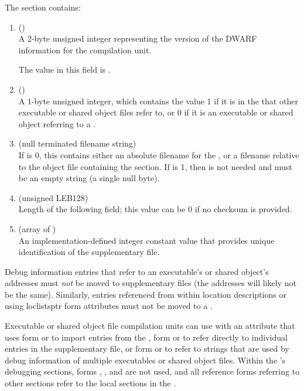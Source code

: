 The \dotdebugsup{} section contains:
\begin{enumerate}[1. ]
\item \HFNversion{} (\HFTuhalf) \\
A 2-byte unsigned integer representing the version of the DWARF
information for the compilation unit. 

The value in this field is \versiondotdebugsup.

\item \HFNissupplementary{} (\HFTubyte) \\
A 1-byte unsigned integer, which contains the value 1 if it is
in the  that other executable or 
shared object files refer to, or 0 if it is an executable or shared object 
referring to a .

\item \HFNsupfilename{} (null terminated filename string) \\
If \HFNissupplementary{} is 0, this contains either an absolute 
filename for the , or a filename 
relative to the object file containing the \dotdebugsup{} section.  
If \HFNissupplementary{} is 1, then \HFNsupfilename{}
is not needed and must be an empty string (a single null byte).

\item \HFNsupchecksumlen{} (unsigned LEB128) \\
Length of the following \HFNsupchecksum{} field; 
this value can be 0 if no checksum is provided.

\item \HFNsupchecksum{} (array of \HFTubyte) \\
An implementation-defined integer constant value that
provides unique identification of the supplementary file.

\end{enumerate}

Debug information entries that refer to an executable's or shared
object's addresses must \emph{not} be moved to supplementary files 
(the addresses will likely not be the same). Similarly,
entries referenced from within location descriptions or using loclistsptr
form attributes must not be moved to a .

Executable or shared object file compilation units can use
\DWTAGimportedunit{} with an
\DWATimport{} attribute that uses form \DWFORMrefsupfour{} or \DWFORMrefsupeight{} 
to import entries from the , 
\bb
form \DWFORMrefsupfour{} or \DWFORMrefsupeight{} 
\eb
to refer directly to individual entries in the supplementary file, or
\bb
form \DWFORMstrpsup{} or \DWFORMstrpsupeight{} 
\eb
to refer to strings that are used by debug information of multiple
executables or shared object files.  Within the 's
debugging sections, forms \DWFORMrefsupfour{}, 
\bb
\DWFORMrefsupeight{}, \DWFORMstrpsup{} and \DWFORMstrpsupeight{}
\eb
are not used, and all reference forms referring to \db other sections
refer to the local sections in the .

